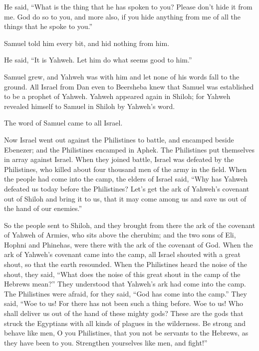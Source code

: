 {\par }{\PP {}He said, “What is the thing that he has spoken to you? Please don’t hide it from me. God do so to you, and more also, if you hide anything from me of all the things that he spoke to you.”
\par }{\PP {}Samuel told him every bit, and hid nothing from him.
\par }{\PP He said, “It is Yahweh. Let him do what seems good to him.”
\par }{\PP {}Samuel grew, and Yahweh was with him and let none of his words fall to the ground.
All Israel from Dan even to Beersheba knew that Samuel was established to be a prophet of Yahweh.
Yahweh appeared again in Shiloh; for Yahweh revealed himself to Samuel in Shiloh by Yahweh’s word.

The word of Samuel came to all Israel.
\par }{\PP Now Israel went out against the Philistines to battle, and encamped beside Ebenezer; and the Philistines encamped in Aphek.
The Philistines put themselves in array against Israel. When they joined battle, Israel was defeated by the Philistines, who killed about four thousand men of the army in the field.
When the people had come into the camp, the elders of Israel said, “Why has Yahweh defeated us today before the Philistines? Let’s get the ark of Yahweh’s covenant out of Shiloh and bring it to us, that it may come among us and save us out of the hand of our enemies.”
\par }{\PP {}So the people sent to Shiloh, and they brought from there the ark of the covenant of Yahweh of Armies, who sits above the cherubim; and the two sons of Eli, Hophni and Phinehas, were there with the ark of the covenant of God.
When the ark of Yahweh’s covenant came into the camp, all Israel shouted with a great shout, so that the earth resounded.
When the Philistines heard the noise of the shout, they said, “What does the noise of this great shout in the camp of the Hebrews mean?” They understood that Yahweh’s ark had come into the camp.
The Philistines were afraid, for they said, “God has come into the camp.” They said, “Woe to us! For there has not been such a thing before.
Woe to us! Who shall deliver us out of the hand of these mighty gods? These are the gods that struck the Egyptians with all kinds of plagues in the wilderness.
Be strong and behave like men, O you Philistines, that you not be servants to the Hebrews, as they have been to you. Strengthen yourselves like men, and fight!”
}
